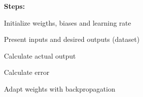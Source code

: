 \documentclass{article}
\begin{document}
\textbf{Steps:}
\begin{enumerate}
\large {
\item Initialize weigths, biases and learning rate
\item Present inputs and desired outputs (dataset)
\item Calculate actual output
\item Calculate error
\item Adapt weights with backpropagation}
\end{enumerate}


    	 
    \vspace{0.5cm}
    

    \section{}
\end{document}
